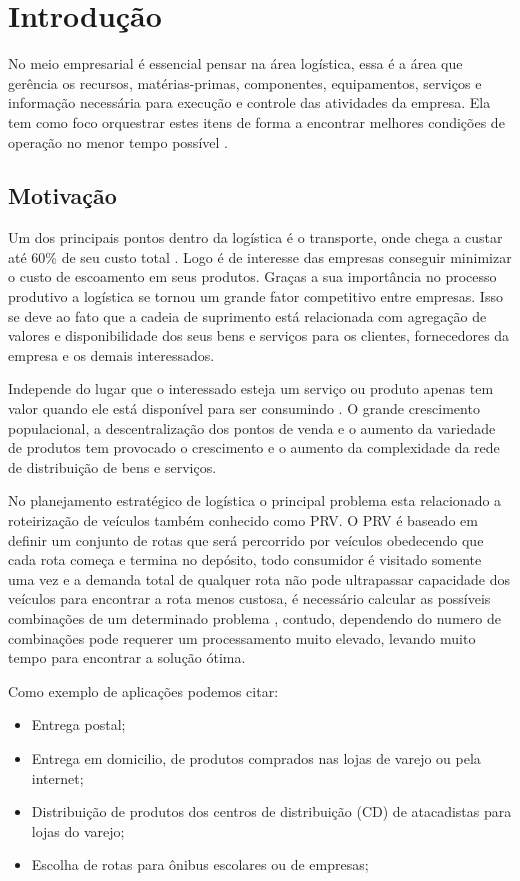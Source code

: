 \chapter[Introdução]{Introdução}

No meio empresarial é essencial pensar na área logística, essa é a área que gerência os recursos, matérias-primas, componentes, equipamentos, serviços e informação necessária para execução e controle das atividades da empresa. 
Ela tem como foco orquestrar estes itens de forma a encontrar melhores condições de operação no menor tempo possível \cite{DIAS}.

\section{Motivação}

Um dos principais pontos dentro da logística é o transporte, onde chega a custar até 60\% de seu custo total \cite{RODRIGUES}.
Logo é de interesse das empresas conseguir minimizar o custo de escoamento em seus produtos.
Graças a sua importância no processo produtivo a logística se tornou um grande fator competitivo entre empresas.
Isso se deve ao fato que a cadeia de suprimento está relacionada com agregação de valores e disponibilidade dos seus bens e serviços para os clientes, fornecedores da empresa e os demais interessados. 

Independe do lugar que o interessado esteja um serviço ou produto apenas tem valor quando ele está disponível para ser consumindo \cite{TSUDA}.
O grande crescimento populacional, a descentralização dos pontos de venda e o aumento da variedade de produtos tem provocado o crescimento e o aumento da complexidade da rede de distribuição de bens e serviços.

No planejamento estratégico de logística o principal problema esta relacionado a roteirização de veículos \cite{TSUDA} também conhecido como PRV. 
O PRV é baseado em definir um conjunto de rotas que será percorrido por veículos obedecendo que cada rota começa e termina no depósito, todo consumidor é visitado somente uma vez e a demanda total de qualquer rota não pode ultrapassar capacidade dos veículos para encontrar a rota menos custosa, é necessário calcular as possíveis combinações de um determinado problema , contudo, dependendo do numero de combinações pode requerer um processamento muito elevado, levando muito tempo para encontrar a solução ótima.

Como exemplo de aplicações podemos citar:
\begin{itemize}
	\item Entrega postal;
	\item Entrega em domicilio, de produtos comprados nas lojas de varejo ou pela internet;
	\item Distribuição de produtos dos centros de distribuição (CD) de atacadistas para lojas do varejo;
	\item Escolha de rotas para ônibus escolares ou de empresas;
\end{itemize}

